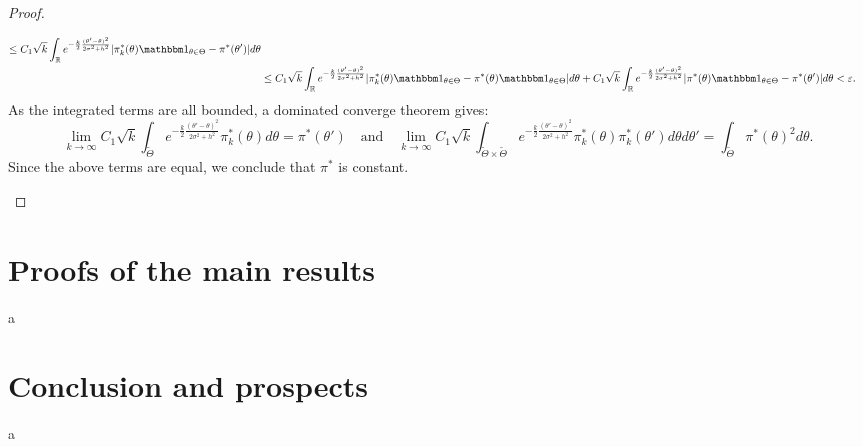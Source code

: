 \begin{proof}
\begin{enumerate}
\begin{equation}
\begin{aligned}
        \leq C_1\sqrt{k}\int_{\RR}e^{-\frac{k}{2}\frac{(\theta'-\theta)^2}{2\sigma^2+h^2}} |\pi^\ast_k(\theta)\indic_{\theta\in\Theta} - \pi^\ast(\theta') |d\theta \\
        &\leq  C_1\sqrt{k}\int_{\RR}e^{-\frac{k}{2}\frac{(\theta'-\theta)^2}{2\sigma^2+h^2}} |\pi^\ast_k(\theta)\indic_{\theta\in\Theta} - \pi^\ast(\theta)\indic_{\theta\in\Theta} |d\theta 
            + C_1\sqrt{k}\int_{\RR}e^{-\frac{k}{2}\frac{(\theta'-\theta)^2}{2\sigma^2+h^2}} |\pi^\ast(\theta)\indic_{\theta\in\Theta} - \pi^\ast(\theta') |d\theta <\eps.\\
        \end{aligned}
        \end{equation}
        As the integrated terms are all bounded, a dominated converge theorem gives:
        \begin{equation}
            \lim_{k\rightarrow\infty}C_1\sqrt{k}\int_{\tilde\Theta} e^{-\frac{k}{2}\frac{(\theta'-\theta)^2}{2\sigma^2+h^2}} \pi_k^\ast(\theta)d\theta = \pi^\ast(\theta')
            \quad\text{and}\quad
            \lim_{k\rightarrow\infty} C_1\sqrt{k}\int_{\tilde\Theta\times\tilde\Theta} e^{-\frac{k}{2}\frac{(\theta'-\theta)^2}{2\sigma^2+h^2}} \pi_k^\ast(\theta)\pi_k^\ast(\theta')d\theta d\theta' = \int_{\tilde\Theta}\pi^\ast(\theta)^2d\theta.
        \end{equation}
        Since the above terms are equal, we conclude that $\pi^\ast$ is constant.





 \end{enumerate}
 


\end{proof}


\section{Proofs of the main results}

a

\section{Conclusion and prospects}

a











